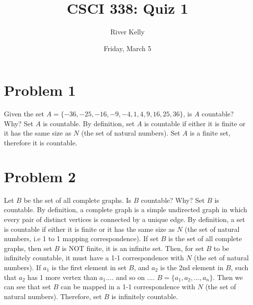 \documentclass[11pt]{article}
\title{CSCI 338: Quiz 1}
\author{River Kelly}
\date{Friday, March 5}
\begin{document}
\maketitle

\newpage
\section*{Problem 1}
Given the set $A=\{-36,-25,-16,-9,-4,1,4,9,16,25,36\}$, is $A$ countable? Why?
\newline
\newline
Set $A$ is countable.
\newline
\newline
By definition, set $A$ is countable if either it is finite or it has the same size as $N$ (the set of natural numbers).
\newline
\newline
Set $A$ is a finite set, therefore it is countable.

\newpage
\section*{Problem 2}
Let $B$ be the set of all complete graphs. Is $B$ countable? Why?
\newline
\newline
Set $B$ is countable.
\newline
\newline
By definition, a complete graph is a simple undirected graph in which every pair of distinct vertices is connected by a unique edge.
\newline
\newline
By definition, a set is countable if either it is finite or it has the same size as $N$ (the set of natural numbers, i.e 1 to 1 mapping correspondence).
\newline
\newline
If set $B$ is the set of all complete graphs, then set $B$ is NOT finite, it is an infinite set. Then, for set $B$ to be infinitely countable, it must have a 1-1 correspondence with $N$ (the set of natural numbers).
\newline
\newline
If $a_1$ is the first element in set $B$, and $a_2$ is the 2nd element in $B$, such that $a_{2}$ has 1 more vertex than $a_{1}$.... and so on .... $B = \{a_{1},a_{2},...,{a_n}\}$. Then we can see that set $B$ can be mapped in a 1-1 correspondence with $N$ (the set of natural numbers).
\newline
\newline
Therefore, set $B$ is infinitely countable.
\end{document}
